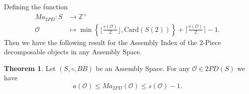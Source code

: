 \documentclass[letterpaper,12pt]{article}
\theoremstyle{definition}
\newtheorem{theorem}{Theorem}
\begin{document}
Defining the function 
\begin{equation}\label{func2pd}
\begin{split}
    Ma_{2PD}:S & \to \mathbb{Z}^+ \\
    \mathscr{O} & \mapsto \min \left\{ \bigg\lfloor \frac{s(\mathscr{O})}{2} \bigg\rfloor, \text{Card}(S(2))  \right\} + \bigg\lceil \frac{s(\mathscr{O})}{2} \bigg\rceil-1.
\end{split}    
\end{equation}
Then we have the following result for the Assembly Index of the 2-Piece decomposable objects in any Assembly Space.
\begin{theorem}
Let $(S,\circ,BB)$ be an Assembly Space. For any $\mathscr{O} \in 2PD(S)$ we have
\begin{equation}\label{ineq2PD}
    a(\mathscr{O}) \leq Ma_{2PD}(\mathscr{O}) \leq s(\mathscr{O})-1.
\end{equation}
\end{theorem}
\end{document}
